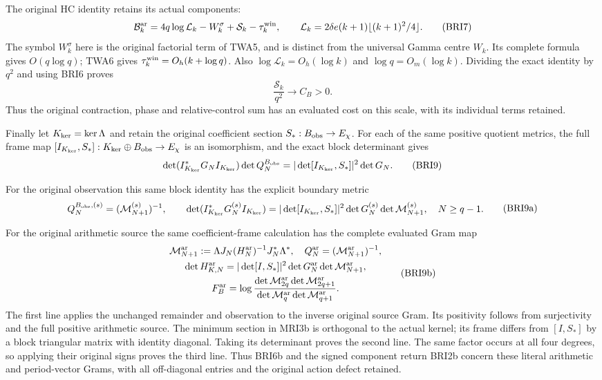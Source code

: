 \documentclass[11pt,a4paper]{article}
\begin{document}
The original HC identity retains its actual components:
\[
 \mathcal B_k^{\rm ar}=4q\log\mathcal L_k-W_k^\sigma
                  +\mathcal S_k-\tau_k^{\rm win},\qquad
 \mathcal L_k=2\delta e(k+1)\lfloor(k+1)^2/4\rfloor.
 \tag{BRI7}
\]
The symbol $W_k^\sigma$ here is the original factorial term of
TWA5, and is distinct from the universal Gamma centre $W_k$.
Its complete formula gives $O(q\log q)$; TWA6 gives
$\tau_k^{\rm win}=O_h(k+\log q)$. Also
$\log\mathcal L_k=O_h(\log k)$ and $\log q=O_m(\log k)$.
Dividing the exact identity by $q^2$ and using BRI6 proves
\[
 \frac{\mathcal S_k}{q^2}\longrightarrow C_B>0.
 \tag{BRI8}
\]
Thus the original contraction, phase and relative-control sum has
an evaluated cost on this scale, with its individual terms retained.

Finally let $K_{\rm ker}=\ker\Lambda$ and retain the original
coefficient section $S_*:B_{\rm obs}\to E_\chi$.
For each of the same positive quotient metrics, the full frame map
$[I_{K_{\rm ker}},S_*]:K_{\rm ker}\oplus B_{\rm obs}\to E_\chi$
is an isomorphism, and the exact block determinant gives
\[
 \det(I_{K_{\rm ker}}^*G_NI_{K_{\rm ker}})\det Q_N^{B_{\rm obs}}
 =|\det[I_{K_{\rm ker}},S_*]|^2\det G_N.
 \tag{BRI9}
\]

For the original observation this same block identity has the
explicit boundary metric
\[
\begin{gathered}
 Q_N^{B_{\rm obs},(s)}=(\mathcal M_{N+1}^{(s)})^{-1},\qquad
 \det(I_{K_{\rm ker}}^*G_N^{(s)}I_{K_{\rm ker}})
 =|\det[I_{K_{\rm ker}},S_*]|^2\det G_N^{(s)}
                                  \det\mathcal M_{N+1}^{(s)},
 \quad N\ge q-1.
\end{gathered}\tag{BRI9a}
\]

For the original arithmetic source the same coefficient-frame
calculation has the complete evaluated Gram map
\[
\begin{gathered}
 \mathcal M_{N+1}^{\rm ar}:=
       \Lambda J_N(H_N^{\rm ar})^{-1}J_N^*\Lambda^*,\quad
 Q_N^{\rm ar}=(\mathcal M_{N+1}^{\rm ar})^{-1},\\
 \det H_{K,N}^{\rm ar}
 =|\det[I,S_*]|^2\det G_N^{\rm ar}
                                    \det\mathcal M_{N+1}^{\rm ar},\\
 F_B^{\rm ar}=\log\frac{
 \det\mathcal M_{2q}^{\rm ar}\det\mathcal M_{2q+1}^{\rm ar}}
 {\det\mathcal M_q^{\rm ar}\det\mathcal M_{q+1}^{\rm ar}}.
\end{gathered}\tag{BRI9b}
\]
The first line applies the unchanged remainder and observation
to the inverse original source Gram. Its positivity follows
from surjectivity and the full positive arithmetic source.
The minimum section in MRI3b is orthogonal to the actual
kernel; its frame differs from $[I,S_*]$ by a block triangular
matrix with identity diagonal. Taking its determinant proves
the second line. The same factor occurs at all four degrees,
so applying their original signs proves the third line.
Thus BRI6b and the signed component return BRI2b concern
these literal arithmetic and period-vector Grams, with all
off-diagonal entries and the original action defect retained.
\end{document}
